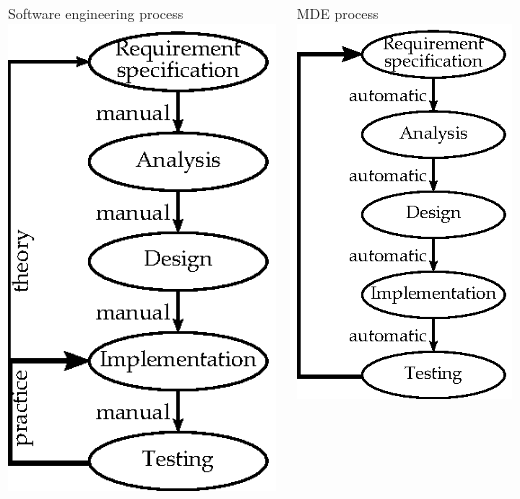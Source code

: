 \documentclass[dvips,slidetop,mathserif,red]{beamer}
\begin{document}
\begin{frame}{}
  \begin{columns}[T]
    \begin{block}{Software engineering process}
      \includegraphics{process_se_3}
    \end{block}
    \begin{block}{MDE process}
      \includegraphics{process_mde}
    \end{block}
  \end{columns}
\end{frame}
\end{document}
